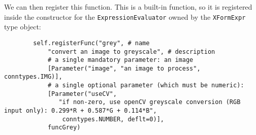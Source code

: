 We can then register this function. This is a built-in function, so it is registered inside the constructor for
the \texttt{ExpressionEvaluator} owned by the \texttt{XFormExpr} type object:

\begin{lstlisting}
        self.registerFunc("grey", # name 
            "convert an image to greyscale", # description
            # a single mandatory parameter: an image
            [Parameter("image", "an image to process", conntypes.IMG)],
            # a single optional parameter (which must be numeric):
            [Parameter("useCV",
               "if non-zero, use openCV greyscale conversion (RGB input only): 0.299*R + 0.587*G + 0.114*B",
                conntypes.NUMBER, deflt=0)],
            funcGrey)
\end{lstlisting}

